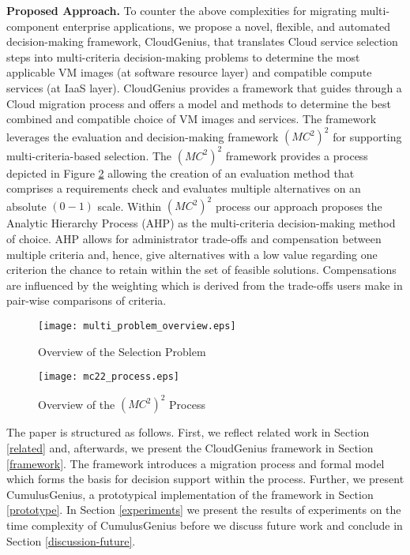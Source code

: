 \documentclass[10pt]{article}
\begin{document}
\textbf{Proposed Approach.} To counter the above complexities for migrating multi-component enterprise applications, we propose a novel, flexible, and automated decision-making framework, CloudGenius, that translates Cloud service selection steps into multi-criteria decision-making problems to determine the most applicable VM images (at software resource layer) and compatible compute services (at IaaS layer). CloudGenius provides a framework that guides through a Cloud migration process and offers a model and methods to determine the best combined and compatible choice of VM images and services. The framework leverages the evaluation and decision-making framework $(MC^2)^2$ \cite{menzel2010} for supporting  multi-criteria-based selection. The $(MC^2)^2$ framework provides a process depicted in Figure \ref{mc22-process} allowing the creation of an evaluation method that comprises a requirements check and evaluates multiple alternatives on an absolute $(0-1)$ scale. Within $(MC^2)^2$ process our approach proposes the Analytic Hierarchy Process (AHP) as the multi-criteria decision-making method of choice. AHP allows for administrator trade-offs and compensation between multiple criteria and, hence, give alternatives with a low value regarding one criterion the chance to retain within the set of feasible solutions. Compensations are influenced by the weighting which is derived from the trade-offs users make in pair-wise comparisons of criteria. 

\begin{figure}[t]
\centering
\texttt{[image: multi\_problem\_overview.eps]} 
\caption{Overview of the Selection Problem}\label{overview-selection}
\end{figure}


\begin{figure}
\centering
\texttt{[image: mc22\_process.eps]} 
\caption{Overview of the $(MC^2)^2$ Process}\label{mc22-process}
\end{figure}

The paper is structured as follows. First, we reflect related work in Section \ref{related} and, afterwards, we present the CloudGenius framework in Section \ref{framework}. The framework introduces a migration process and formal model which forms the basis for decision support within the process. Further, we present CumulusGenius, a prototypical implementation of the framework in Section \ref{prototype}. In Section \ref{experiments} we present the results of experiments on the time complexity of CumulusGenius before we discuss future work and conclude in Section \ref{discussion-future}.
\end{document}
